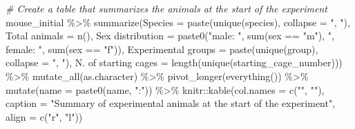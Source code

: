 \documentclass[
]{book}
\newenvironment{Shaded}{\begin{snugshade}}{\end{snugshade}}
\newcommand{\AttributeTok}[1]{\textcolor[rgb]{0.77,0.63,0.00}{#1}}
\newcommand{\CommentTok}[1]{\textcolor[rgb]{0.56,0.35,0.01}{\textit{#1}}}
\newcommand{\FunctionTok}[1]{\textcolor[rgb]{0.00,0.00,0.00}{#1}}
\newcommand{\NormalTok}[1]{#1}
\newcommand{\OtherTok}[1]{\textcolor[rgb]{0.56,0.35,0.01}{#1}}
\newcommand{\SpecialCharTok}[1]{\textcolor[rgb]{0.00,0.00,0.00}{#1}}
\newcommand{\StringTok}[1]{\textcolor[rgb]{0.31,0.60,0.02}{#1}}
\begin{document}
\begin{Shaded}
\begin{Highlighting}[]
\CommentTok{\# Create a table that summarizes the animals at the start of the experiment}
\NormalTok{mouse\_initial }\SpecialCharTok{\%\textgreater{}\%} 
  \FunctionTok{summarize}\NormalTok{(}\AttributeTok{Species =} \FunctionTok{paste}\NormalTok{(}\FunctionTok{unique}\NormalTok{(species), }\AttributeTok{collapse =} \StringTok{", "}\NormalTok{), }
            \StringTok{\textasciigrave{}}\AttributeTok{Total animals}\StringTok{\textasciigrave{}} \OtherTok{=} \FunctionTok{n}\NormalTok{(), }
            \StringTok{\textasciigrave{}}\AttributeTok{Sex distribution}\StringTok{\textasciigrave{}} \OtherTok{=} \FunctionTok{paste0}\NormalTok{(}\StringTok{"male: "}\NormalTok{, }\FunctionTok{sum}\NormalTok{(sex }\SpecialCharTok{==} \StringTok{"m"}\NormalTok{), }
                                      \StringTok{", female: "}\NormalTok{, }\FunctionTok{sum}\NormalTok{(sex }\SpecialCharTok{==} \StringTok{"f"}\NormalTok{)),}
            \StringTok{\textasciigrave{}}\AttributeTok{Experimental groups}\StringTok{\textasciigrave{}} \OtherTok{=} \FunctionTok{paste}\NormalTok{(}\FunctionTok{unique}\NormalTok{(group), }\AttributeTok{collapse =} \StringTok{", "}\NormalTok{),}
            \StringTok{\textasciigrave{}}\AttributeTok{N. of starting cages}\StringTok{\textasciigrave{}} \OtherTok{=}
              \FunctionTok{length}\NormalTok{(}\FunctionTok{unique}\NormalTok{(starting\_cage\_number))) }\SpecialCharTok{\%\textgreater{}\%} 
  \FunctionTok{mutate\_all}\NormalTok{(as.character) }\SpecialCharTok{\%\textgreater{}\%} 
  \FunctionTok{pivot\_longer}\NormalTok{(}\FunctionTok{everything}\NormalTok{()) }\SpecialCharTok{\%\textgreater{}\%} 
  \FunctionTok{mutate}\NormalTok{(}\AttributeTok{name =} \FunctionTok{paste0}\NormalTok{(name, }\StringTok{":"}\NormalTok{)) }\SpecialCharTok{\%\textgreater{}\%} 
\NormalTok{  knitr}\SpecialCharTok{::}\FunctionTok{kable}\NormalTok{(}\AttributeTok{col.names =} \FunctionTok{c}\NormalTok{(}\StringTok{""}\NormalTok{, }\StringTok{""}\NormalTok{), }
               \AttributeTok{caption =} \StringTok{"Summary of experimental animals at the start of the experiment"}\NormalTok{, }
               \AttributeTok{align =} \FunctionTok{c}\NormalTok{(}\StringTok{"r"}\NormalTok{, }\StringTok{"l"}\NormalTok{))}
\end{Highlighting}
\end{Shaded}
\end{document}
